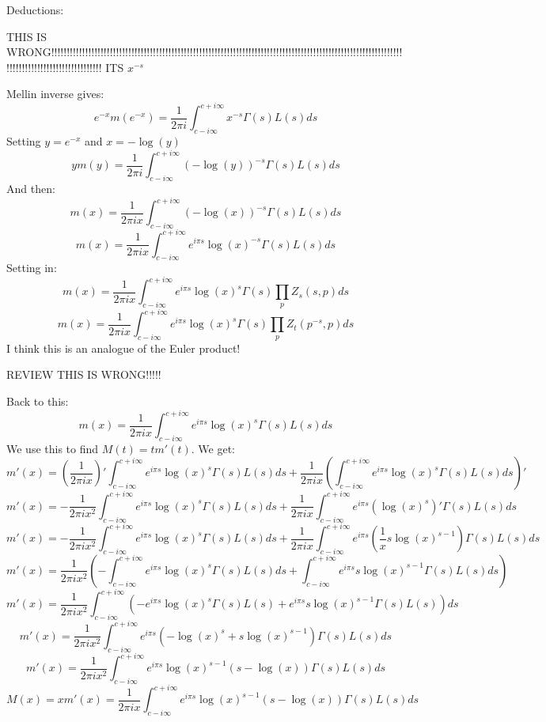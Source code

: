 \documentclass[a4paper]{amsart}
\begin{document}
Deductions:

THIS IS WRONG!!!!!!!!!!!!!!!!!!!!!!!!!!!!!!!!!!!!!!!!!!!!!!!!!!!!!!!!!!!!!!!!!!!!!!!!!!!!!!!!!!!!!!!!!!!!!!!!!!!!!!!!!!!!!!!!!!!!!!!!!!!!!!!!!!!!!!!!!!!!!!!!!
ITS $x^{-s}$


Mellin inverse gives:
$$e^{-x}m(e^{-x}) = \frac{1}{2\pi i}\int_{c - i\infty}^{c + i\infty}x^{-s} \Gamma(s)L(s)ds$$
Setting $y = e^{-x}$ and $x = -\log(y)$
$$y m(y) = \frac{1}{2\pi i}\int_{c - i\infty}^{c + i\infty}(-\log(y))^{-s} \Gamma(s)L(s)ds$$
And then:
$$m(x) = \frac{1}{2\pi i x} \int_{c - i\infty}^{c + i\infty}(-\log(x))^{-s} \Gamma(s)L(s)ds$$
$$m(x) = \frac{1}{2\pi i x} \int_{c - i\infty}^{c + i\infty}e^{i\pi s}\log(x)^{-s} \Gamma(s)L(s)ds$$
Setting in:
$$m(x) = \frac{1}{2\pi i x} \int_{c - i\infty}^{c + i\infty}e^{i\pi s}\log(x)^s \Gamma(s)\prod_p Z_s(s, p)ds$$
$$m(x) = \frac{1}{2\pi i x} \int_{c - i\infty}^{c + i\infty}e^{i\pi s}\log(x)^s \Gamma(s)\prod_p Z_t(p^{-s}, p)ds$$
I think this is an analogue of the Euler product!

REVIEW THIS IS WRONG!!!!! 

Back to this:
$$m(x) = \frac{1}{2\pi i x} \int_{c - i\infty}^{c + i\infty}e^{i\pi s}\log(x)^s \Gamma(s)L(s)ds$$
We use this to find $M(t) = t m'(t)$. We get:
$$m'(x) = \left(\frac{1}{2\pi i x}\right)' \int_{c - i\infty}^{c + i\infty}e^{i\pi s}\log(x)^s \Gamma(s)L(s)ds + \frac{1}{2\pi i x} \left(\int_{c - i\infty}^{c + i\infty}e^{i\pi s}\log(x)^s \Gamma(s)L(s)ds\right)'$$
$$m'(x) = -\frac{1}{2\pi i x^2} \int_{c - i\infty}^{c + i\infty}e^{i\pi s}\log(x)^s \Gamma(s)L(s)ds + \frac{1}{2\pi i x} \int_{c - i\infty}^{c + i\infty}e^{i\pi s}\left(\log(x)^s\right)' \Gamma(s)L(s)ds$$
$$m'(x) = -\frac{1}{2\pi i x^2} \int_{c - i\infty}^{c + i\infty}e^{i\pi s}\log(x)^s \Gamma(s)L(s)ds + \frac{1}{2\pi i x} \int_{c - i\infty}^{c + i\infty}e^{i\pi s}\left(\frac{1}{x}s\log(x)^{s-1}\right) \Gamma(s)L(s)ds$$
$$m'(x) = \frac{1}{2\pi i x^2}\left(-\int_{c - i\infty}^{c + i\infty}e^{i\pi s}\log(x)^s \Gamma(s)L(s)ds + \int_{c - i\infty}^{c + i\infty}e^{i\pi s}s\log(x)^{s-1} \Gamma(s)L(s)ds\right)$$
$$m'(x) = \frac{1}{2\pi i x^2}\int_{c - i\infty}^{c + i\infty}\left(-e^{i\pi s}\log(x)^s \Gamma(s)L(s) + e^{i\pi s}s\log(x)^{s-1} \Gamma(s)L(s)\right)ds$$
$$m'(x) = \frac{1}{2\pi i x^2}\int_{c - i\infty}^{c + i\infty}e^{i\pi s}\left(-\log(x)^s + s\log(x)^{s-1}\right) \Gamma(s)L(s)ds$$
$$m'(x) = \frac{1}{2\pi i x^2}\int_{c - i\infty}^{c + i\infty}e^{i\pi s}\log(x)^{s - 1}(s-\log(x)) \Gamma(s)L(s)ds$$
$$M(x) = xm'(x) = \frac{1}{2\pi i x}\int_{c - i\infty}^{c + i\infty}e^{i\pi s}\log(x)^{s - 1}(s-\log(x)) \Gamma(s)L(s)ds$$
\end{document}
